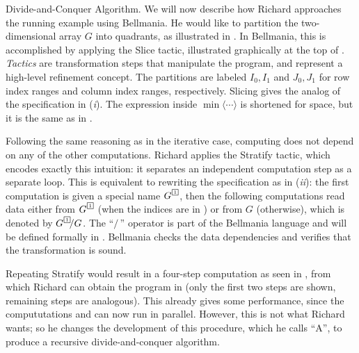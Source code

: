 \begin{paragraph}{Divide-and-Conquer Algorithm.}
We will now describe how Richard approaches the running example using Bellmania.
He would like to partition the two-di\-men\-sio\-nal array $G$ into
quadrants, as illustrated in .
In Bellmania, this is accomplished by applying the {\sf Slice} tactic,
illustrated graphically at the top of .
{\em Tactics} are transformation steps that manipulate the program,
and represent a high-level refinement concept.
The partitions are labeled $I_0,I_1$ and $J_0,J_1$ for row index ranges and column index ranges,
respectively.
Slicing gives the analog of the specification in ({\it i}).
The expression inside $\min\langle\cdots\rangle$ is shortened for space,
but it is the same as in .

Following the same reasoning as in the iterative case, computing 
does not depend on any of the other computations. Richard applies the
{\sf Stratify} tactic, which encodes exactly this intuition: it separates
an independent computation step as a separate loop.
This is equivalent to rewriting the specification as in ({\it ii}):
the first computation is given a special name $G^{\tinyqbox1}$, then the following
computations read data either from $G^{\tinyqbox1}$ (when the indices are in )
or from $G$ (otherwise), which is denoted by $G^{\tinyqbox1}\!/G$. The ``$/\,$'' operator
is part of the Bellmania language and will be defined formally in .
Bellmania checks the data dependencies and verifies that the transformation
is sound.

Repeating {\sf Stratify} would result in a four-step computation
as seen in , from which Richard can obtain the program in 
(only the first two steps are shown, remaining steps are analogous).
This already gives some performance, since the compututations  and 
can now run in parallel. However, this is not what Richard wants; so he
changes the development of this procedure, which he calls ``A'', to produce
a recursive divide-and-conquer algorithm.
\end{paragraph}


